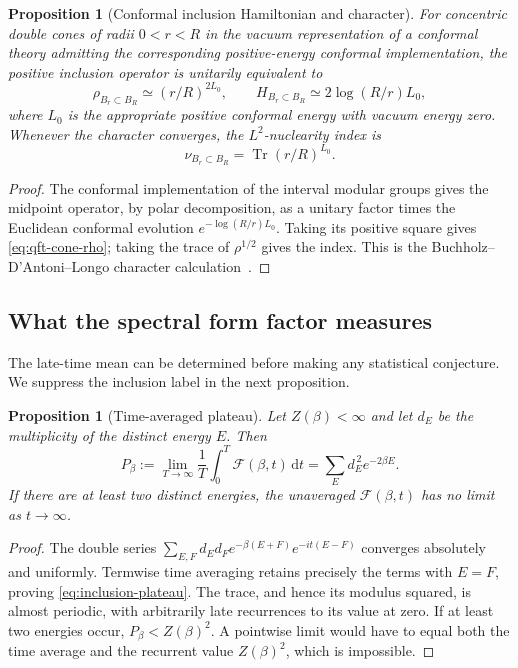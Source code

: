 \documentclass[a4paper,11pt]{article}
\newtheorem{proposition}[theorem]{Proposition}
\theoremstyle{definition}
\begin{document}
\begin{proposition}[Conformal inclusion Hamiltonian and character]\label{prop:cone-nuclearity}
For concentric double cones of radii $0<r<R$ in the vacuum representation of a conformal theory admitting the corresponding positive-energy conformal implementation, the positive inclusion operator is unitarily equivalent to
\begin{equation}
 \rho_{B_r\subset B_R}\simeq(r/R)^{2L_0},\qquad
 H_{B_r\subset B_R}\simeq2\log(R/r)L_0,
 \label{eq:qft-cone-rho}
\end{equation}
where $L_0$ is the appropriate positive conformal energy with vacuum energy zero. Whenever the character converges, the $L^2$-nuclearity index is
\begin{equation}
 \nu_{B_r\subset B_R}=\operatorname{Tr}(r/R)^{L_0}.
\end{equation}
\end{proposition}
\begin{proof}
The conformal implementation of the interval modular groups gives the midpoint operator, by polar decomposition, as a unitary factor times the Euclidean conformal evolution $e^{-\log(R/r)L_0}$. Taking its positive square gives \eqref{eq:qft-cone-rho}; taking the trace of $\rho^{1/2}$ gives the index. This is the Buchholz--D'Antoni--Longo character calculation~\cite{BDL2007}.
\end{proof}

\subsection{What the spectral form factor measures}

The late-time mean can be determined before making any statistical conjecture. We suppress the inclusion label in the next proposition.

\begin{proposition}[Time-averaged plateau]\label{prop:inclusion-plateau}
Let $Z(\beta)<\infty$ and let $d_E$ be the multiplicity of the distinct energy $E$. Then
\begin{equation}
 P_\beta:=\lim_{T\to\infty}\frac1T\int_0^T\mathcal F(\beta,t)\,\mathrm dt
   =\sum_E d_E^{\,2}e^{-2\beta E}.
 \label{eq:inclusion-plateau}
\end{equation}
If there are at least two distinct energies, the unaveraged $\mathcal F(\beta,t)$ has no limit as $t\to\infty$.
\end{proposition}
\begin{proof}
The double series
$\sum_{E,F}d_Ed_F e^{-\beta(E+F)}e^{-it(E-F)}$
converges absolutely and uniformly. Termwise time averaging retains precisely the terms with $E=F$, proving \eqref{eq:inclusion-plateau}. The trace, and hence its modulus squared, is almost periodic, with arbitrarily late recurrences to its value at zero. If at least two energies occur, $P_\beta<Z(\beta)^2$. A pointwise limit would have to equal both the time average and the recurrent value $Z(\beta)^2$, which is impossible.
\end{proof}
\end{document}
